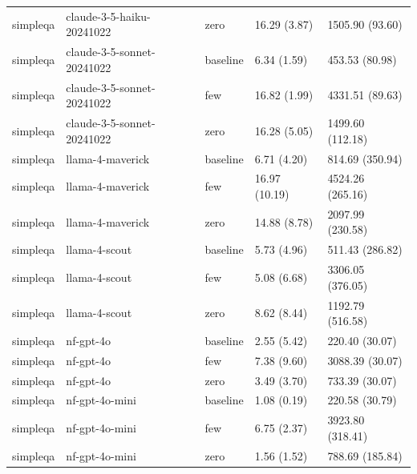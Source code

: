 \begin{table}[htbp]
\begin{tabular}{lllll}
simpleqa & claude-3-5-haiku-20241022 & zero &  16.29 (3.87) & 1505.90 (93.60) \\
simpleqa & claude-3-5-sonnet-20241022 & baseline &   6.34 (1.59) & 453.53 (80.98) \\
simpleqa & claude-3-5-sonnet-20241022 & few &  16.82 (1.99) & 4331.51 (89.63) \\
simpleqa & claude-3-5-sonnet-20241022 & zero &  16.28 (5.05) & 1499.60 (112.18) \\
simpleqa & llama-4-maverick & baseline &   6.71 (4.20) & 814.69 (350.94) \\
simpleqa & llama-4-maverick & few &  16.97 (10.19) & 4524.26 (265.16) \\
simpleqa & llama-4-maverick & zero &  14.88 (8.78) & 2097.99 (230.58) \\
simpleqa & llama-4-scout & baseline &   5.73 (4.96) & 511.43 (286.82) \\
simpleqa & llama-4-scout & few &   5.08 (6.68) & 3306.05 (376.05) \\
simpleqa & llama-4-scout & zero &   8.62 (8.44) & 1192.79 (516.58) \\
simpleqa & nf-gpt-4o & baseline &   2.55 (5.42) & 220.40 (30.07) \\
simpleqa & nf-gpt-4o & few &   7.38 (9.60) & 3088.39 (30.07) \\
simpleqa & nf-gpt-4o & zero &   3.49 (3.70) & 733.39 (30.07) \\
simpleqa & nf-gpt-4o-mini & baseline &   1.08 (0.19) & 220.58 (30.79) \\
simpleqa & nf-gpt-4o-mini & few &   6.75 (2.37) & 3923.80 (318.41) \\
simpleqa & nf-gpt-4o-mini & zero &   1.56 (1.52) & 788.69 (185.84) \\
\bottomrule
\end{tabular}
\end{table}

